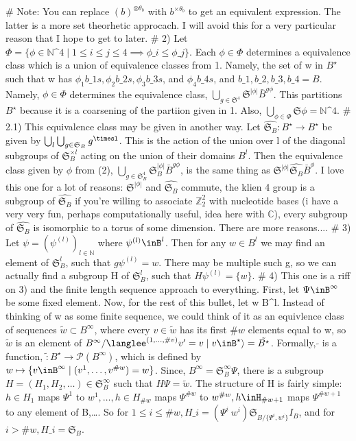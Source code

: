 # Note: You can replace $(b)^{\otimes\theta_b} $ with $ {b}^{\times\theta_b}$  to get an equivalent expression. The latter is a more set theorhetic approcach. I will avoid this for a very particular reason that I hope to get to later.
# 2) Let $ \Phi = \{ \phi\in\mathbb{N}\^4 \mid 1 \le i \le j \le 4 \implies\phi\_i\le\phi\_j\} $. Each $ \phi \in \Phi $ determines a equivalence class which is a union of equivalence classes from 1. Namely, the set of w in $ B^\star $ such that w has $\phi_1 b\_1s, \phi_2 b\_2s, \phi_3 b\_3s$, and $\phi_4 b\_4s$, and ${b\_1,b\_2,b\_3,b\_4}=B$. Namely, $ \phi\in\Phi $ determines the equivalence class, $ \bigcup_{g\in\mathfrak{S}^4} \mathfrak{S}^{|\phi|} \bar{B}^{g \phi} $. This partitions $ B^\star $ because it is a coarsening of the partiion given in 1. Also, $ \bigcup_{\phi\in\Phi} \mathfrak{S}\phi = \mathbb{N}\^4 $.
# 2.1) This equivalence class may be given in another way. Let $\widehat{\mathfrak{S}_B}:B^\star\to B^\star$ be given by $\bigcup_l \bigcup_{g\in\mathfrak{S}_B}g^{\timesl}$. This is the action of the union over l of the diagonal subgroups of  $\mathfrak{S}_B^{\times l}$ acting on the union of their domains $B^l$. Then the equivalence class given by $\phi$ from (2),  $\bigcup_{g\in\mathfrak{S}_B^4} \mathfrak{S}_B^{|\phi|} \bar{B}^{g\phi}$, is the same thing as $\mathfrak{S}^{|\phi|}\widehat{\mathfrak{S}_B}\bar{B}^\phi$. I love this one for a lot of reasons: $\mathfrak{S}^{|\phi|}$ and $\widehat{\mathfrak{S}_B}$ commute, the klien 4 group is a subgroup of $ \widehat{\mathfrak{S}_B}$ if you're willing to associate $\mathbb{Z}_2^2$ with nucleotide bases (i have a very very fun, perhaps computationally useful, idea here with $\mathbb{C}$), every subgroup of $\widehat{\mathfrak{S}_B}$ is  isomorphic to a torus of some dimension. There are more reasons.... 
# 3) Let $\psi = (\psi^{(l)})_{l\in\mathbb{N}}$ where $\psi^{(l)} \inB^l$. Then for any $w \in B^l$ we may find an element of $ \mathfrak{S}_B^l $, such that $ g\psi^{(l)} = w $. There may be multiple such g, so we can actually find a subgroup H of $ \mathfrak{S}_B^l $, such that $ H\psi^{(l)} = \{w\} $.
# 4) This one is a riff on 3) and the finite length sequence approach to everything. First, let $ \Psi \inB^\infty $ be some fixed element. Now, for the rest of this bullet, let w \in B^l. Instead of thinking of w as some finite sequence, we could think of it as an equivlence class of sequences $ \tilde{w} \subset B^\infty $, where every $ v \in \tilde{w} $ has its first $ \# w $  elements equal to w, so $\tilde{w}$ is an element of $ B^\infty / \langlee^{(1,\dots,\# v)} v' = v \mid v\inB^\star\rangle=\tilde{B^\star} $. Formally, $\tilde{}$ is a function, $\tilde:B^\star\to\mathscr{P}(B^\infty)$, which is defined by $ w\mapsto\{v\inB^\infty\mid (v^1,\dots,v^{\# w}) = w \}$. Since, $B^\infty = \mathfrak{S}_B^\infty \Psi $, there is a subgroup $ H = (H_1,H_2,\dots) \in \mathfrak{S}_B^\infty $ such that $ H\Psi = \tilde{w}$. The structure of H is fairly simple: $ h \in H_1 $ maps $ \Psi^1 $ to $ w^1,\dots,h \in H_{\# w}$ maps $ \Psi^{\# w} $ to $ w^{\# w},h\inH_{\# w + 1} $ maps $ \Psi^{\# w +1}$ to any element of B,\dots. So for $ 1 \le i \le \# w, H\_i = (\Psi^i \: w^i)\mathfrak{S}_{ B / \{\Psi^i,w^i\}}I_B $, and for $ i>\#w, H\_i = \mathfrak{S}_B $.

